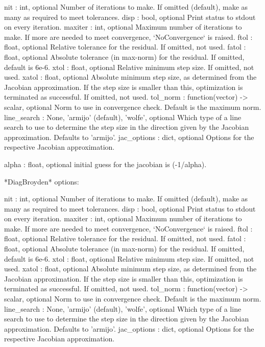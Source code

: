 \begin{DoxyVerb}
    nit : int, optional
        Number of iterations to make. If omitted (default), make as many
        as required to meet tolerances.
    disp : bool, optional
        Print status to stdout on every iteration.
    maxiter : int, optional
        Maximum number of iterations to make. If more are needed to
        meet convergence, `NoConvergence` is raised.
    ftol : float, optional
        Relative tolerance for the residual. If omitted, not used.
    fatol : float, optional
        Absolute tolerance (in max-norm) for the residual.
        If omitted, default is 6e-6.
    xtol : float, optional
        Relative minimum step size. If omitted, not used.
    xatol : float, optional
        Absolute minimum step size, as determined from the Jacobian
        approximation. If the step size is smaller than this, optimization
        is terminated as successful. If omitted, not used.
    tol_norm : function(vector) -> scalar, optional
        Norm to use in convergence check. Default is the maximum norm.
    line_search : {None, 'armijo' (default), 'wolfe'}, optional
        Which type of a line search to use to determine the step size in
        the direction given by the Jacobian approximation. Defaults to
        'armijo'.
    jac_options : dict, optional
        Options for the respective Jacobian approximation.

        alpha : float, optional
            initial guess for the jacobian is (-1/alpha).

*DiagBroyden* options:

    nit : int, optional
        Number of iterations to make. If omitted (default), make as many
        as required to meet tolerances.
    disp : bool, optional
        Print status to stdout on every iteration.
    maxiter : int, optional
        Maximum number of iterations to make. If more are needed to
        meet convergence, `NoConvergence` is raised.
    ftol : float, optional
        Relative tolerance for the residual. If omitted, not used.
    fatol : float, optional
        Absolute tolerance (in max-norm) for the residual.
        If omitted, default is 6e-6.
    xtol : float, optional
        Relative minimum step size. If omitted, not used.
    xatol : float, optional
        Absolute minimum step size, as determined from the Jacobian
        approximation. If the step size is smaller than this, optimization
        is terminated as successful. If omitted, not used.
    tol_norm : function(vector) -> scalar, optional
        Norm to use in convergence check. Default is the maximum norm.
    line_search : {None, 'armijo' (default), 'wolfe'}, optional
        Which type of a line search to use to determine the step size in
        the direction given by the Jacobian approximation. Defaults to
        'armijo'.
    jac_options : dict, optional
        Options for the respective Jacobian approximation.


\end{DoxyVerb}
